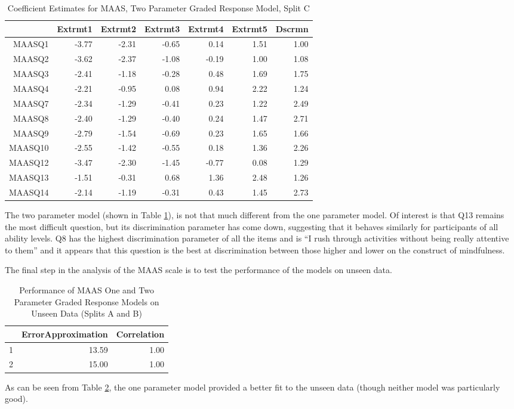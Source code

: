 \documentclass{article}
\begin{document}
\begin{table}[ht]
\centering
\begin{tabular}{rrrrrrr}
  \hline
 & Extrmt1 & Extrmt2 & Extrmt3 & Extrmt4 & Extrmt5 & Dscrmn \\ 
  \hline
MAASQ1 & -3.77 & -2.31 & -0.65 & 0.14 & 1.51 & 1.00 \\ 
  MAASQ2 & -3.62 & -2.37 & -1.08 & -0.19 & 1.00 & 1.08 \\ 
  MAASQ3 & -2.41 & -1.18 & -0.28 & 0.48 & 1.69 & 1.75 \\ 
  MAASQ4 & -2.21 & -0.95 & 0.08 & 0.94 & 2.22 & 1.24 \\ 
  MAASQ7 & -2.34 & -1.29 & -0.41 & 0.23 & 1.22 & 2.49 \\ 
  MAASQ8 & -2.40 & -1.29 & -0.40 & 0.24 & 1.47 & 2.71 \\ 
  MAASQ9 & -2.79 & -1.54 & -0.69 & 0.23 & 1.65 & 1.66 \\ 
  MAASQ10 & -2.55 & -1.42 & -0.55 & 0.18 & 1.36 & 2.26 \\ 
  MAASQ12 & -3.47 & -2.30 & -1.45 & -0.77 & 0.08 & 1.29 \\ 
  MAASQ13 & -1.51 & -0.31 & 0.68 & 1.36 & 2.48 & 1.26 \\ 
  MAASQ14 & -2.14 & -1.19 & -0.31 & 0.43 & 1.45 & 2.73 \\ 
   \hline
\end{tabular}
\caption{Coefficient Estimates for MAAS, Two Parameter Graded Response Model, Split C} 
\label{tab:maas2cgrm2pl}
\end{table}
The two parameter model (shown in Table \ref{tab:maas2cgrm2pl}), is not that much different from the one parameter model. Of interest is that Q13 remains the most difficult question, but its discrimination parameter has come down, suggesting that it behaves similarly for participants of all ability levels. Q8 has the highest discrimination parameter of all the items and is ``I rush through activities without being really attentive to them'' and it appears that this question is the best at discrimination between those higher and lower on the construct of mindfulness. 


The final step in the analysis of the MAAS scale is to test the performance of the models on unseen  data. 


\begin{table}[ht]
\centering
\begin{tabular}{rrr}
  \hline
 & ErrorApproximation & Correlation \\ 
  \hline
1 & 13.59 & 1.00 \\ 
  2 & 15.00 & 1.00 \\ 
   \hline
\end{tabular}
\caption{Performance of MAAS One and Two Parameter Graded Response Models on Unseen Data (Splits A and B)} 
\label{tab:maas2cgrmtest}
\end{table}
As can be seen from Table \ref{tab:maas2cgrmtest}, the one parameter model provided a better fit to the unseen data (though neither model was particularly good). 
\end{document}
